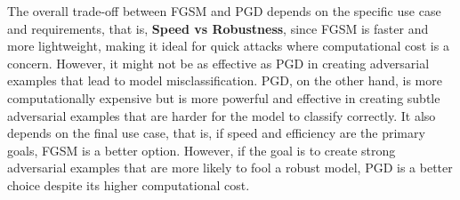 \documentclass{article}
\begin{document}
The overall trade-off between FGSM and PGD depends on the specific use case and requirements, that is, \textbf{Speed vs Robustness},
since FGSM is faster and more lightweight, making it ideal for quick attacks where computational cost is a concern.
However, it might not be as effective as PGD in creating adversarial examples that lead to model misclassification.
PGD, on the other hand, is more computationally expensive but is more powerful and effective in creating subtle
adversarial examples that are harder for the model to classify correctly. It also depends on the final use case, that is,
if speed and efficiency are the primary goals, FGSM is a better option. However, if the goal is to create strong
adversarial examples that are more likely to fool a robust model, PGD is a better choice despite its higher
computational cost.





















\newpage

 
\end{document}
